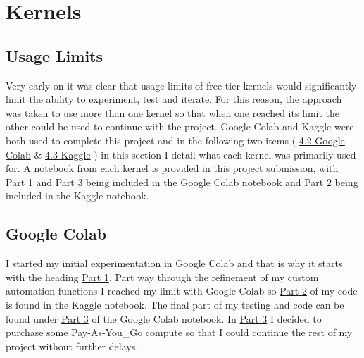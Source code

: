 \documentclass[
  letterpaper,
  DIV=11,
  numbers=noendperiod]{scrartcl}
\begin{document}
\hypertarget{kernels}{%
\section{Kernels}\label{kernels}}

\hypertarget{usage-limits}{%
\subsection{Usage Limits}\label{usage-limits}}

Very early on it was clear that usage limits of free tier kernels would
significantly limit the ability to experiment, test and iterate. For
this reason, the approach was taken to use more than one kernel so that
when one reached its limit the other could be used to continue with the
project. Google Colab and Kaggle were both used to complete this project
and in the following two items ( \protect\hyperlink{google-colab}{4.2
Google Colab} \& \protect\hyperlink{kaggle}{4.3 Kaggle} ) in this
section I detail what each kernel was primarily used for. A notebook
from each kernel is provided in this project submission, with
\href{https://colab.research.google.com/drive/1yeosl7vmtW30dD0OBt96jLhi_p4ViRjI}{Part
1} and
\href{https://colab.research.google.com/drive/1yeosl7vmtW30dD0OBt96jLhi_p4ViRjI\#scrollTo=KaiXfoJTJrKa}{Part
3} being included in the Google Colab notebook and
\href{https://www.kaggle.com/code/brandontoews/fastaiassignment2-part2}{Part
2} being included in the Kaggle notebook.

\hypertarget{google-colab}{%
\subsection{Google Colab}\label{google-colab}}

I started my initial experimentation in Google Colab and that is why it
starts with the heading
\href{https://colab.research.google.com/drive/1yeosl7vmtW30dD0OBt96jLhi_p4ViRjI}{Part
1}. Part way through the refinement of my custom automation functions I
reached my limit with Google Colab so
\href{https://www.kaggle.com/code/brandontoews/fastaiassignment2-part2}{Part
2} of my code is found in the Kaggle notebook. The final part of my
testing and code can be found under
\href{https://colab.research.google.com/drive/1yeosl7vmtW30dD0OBt96jLhi_p4ViRjI\#scrollTo=KaiXfoJTJrKa}{Part
3} of the Google Colab notebook. In
\href{https://colab.research.google.com/drive/1yeosl7vmtW30dD0OBt96jLhi_p4ViRjI\#scrollTo=KaiXfoJTJrKa}{Part
3} I decided to purchase some Pay-As-You\_Go compute so that I could
continue the rest of my project without further delays.
\end{document}
